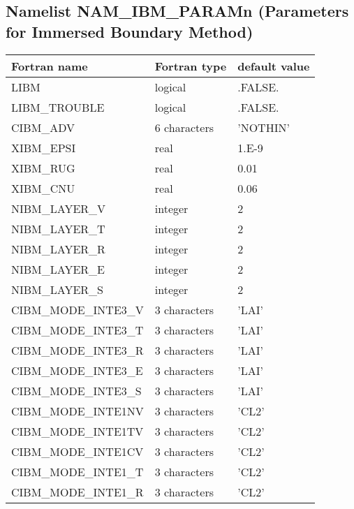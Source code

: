 \subsection{Namelist NAM\_IBM\_PARAMn (Parameters for Immersed Boundary Method)}
\begin{longtable} {|p{}|p{}|p{}|}
\hline
Fortran name &  Fortran type & default value \\
\hline \hline
\endhead
LIBM                 & logical       & .FALSE.       \\
LIBM\_TROUBLE        & logical       & .FALSE.       \\
CIBM\_ADV            & 6 characters  & 'NOTHIN'      \\
XIBM\_EPSI           & real          & 1.E-9         \\
XIBM\_RUG            & real          & 0.01          \\
XIBM\_CNU            & real          & 0.06          \\\hline
NIBM\_LAYER\_V       & integer       & 2             \\
NIBM\_LAYER\_T       & integer       & 2             \\
NIBM\_LAYER\_R       & integer       & 2             \\
NIBM\_LAYER\_E       & integer       & 2             \\\hline
NIBM\_LAYER\_S       & integer       & 2             \\
CIBM\_MODE\_INTE3\_V & 3 characters  & 'LAI'         \\
CIBM\_MODE\_INTE3\_T & 3 characters  & 'LAI'         \\
CIBM\_MODE\_INTE3\_R & 3 characters  & 'LAI'         \\
CIBM\_MODE\_INTE3\_E & 3 characters  & 'LAI'         \\
CIBM\_MODE\_INTE3\_S & 3 characters  & 'LAI'         \\\hline
CIBM\_MODE\_INTE1NV  & 3 characters  & 'CL2'         \\
CIBM\_MODE\_INTE1TV  & 3 characters  & 'CL2'         \\
CIBM\_MODE\_INTE1CV  & 3 characters  & 'CL2'         \\
CIBM\_MODE\_INTE1\_T & 3 characters  & 'CL2'         \\
CIBM\_MODE\_INTE1\_R & 3 characters  & 'CL2'         \\

\end{longtable}
